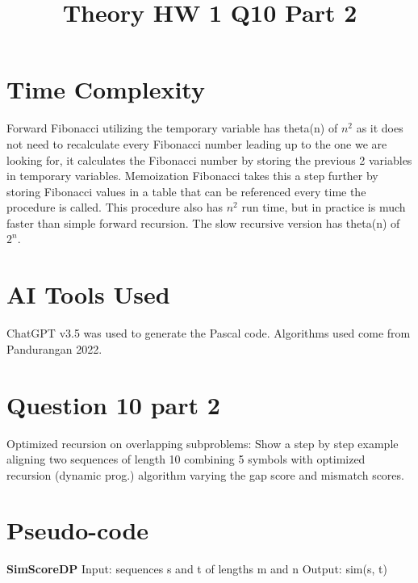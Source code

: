 \documentclass[conference]{IEEEtran}
\begin{document}
\section{Time Complexity}
Forward Fibonacci utilizing the temporary variable has theta(n) of $n^2$ as it does not need to recalculate every Fibonacci number leading up to the one we are looking for, it calculates the Fibonacci number by storing the previous 2 variables in temporary variables. Memoization Fibonacci takes this a step further by storing Fibonacci values in a table that can be referenced every time the procedure is called. This procedure also has $n^2$ run time, but in practice is much faster than simple forward recursion. The slow recursive version has theta(n) of $2^n$.

\section{AI Tools Used}
ChatGPT v3.5 was used to generate the Pascal code. Algorithms used come from Pandurangan 2022.


\title{Theory HW 1 Q10 Part 2}

\author{
}

\maketitle

\section{Question 10 part 2}
%
Optimized recursion on overlapping subproblems:
Show a step by step example aligning two sequences of length 10 combining 5 symbols with
optimized recursion (dynamic prog.) algorithm varying the gap score and mismatch scores.




\section{Pseudo-code}

\textbf{SimScoreDP}
\newline
Input: sequences s and t of lengths m and n
\newline
Output: sim(s, t)
\end{document}
